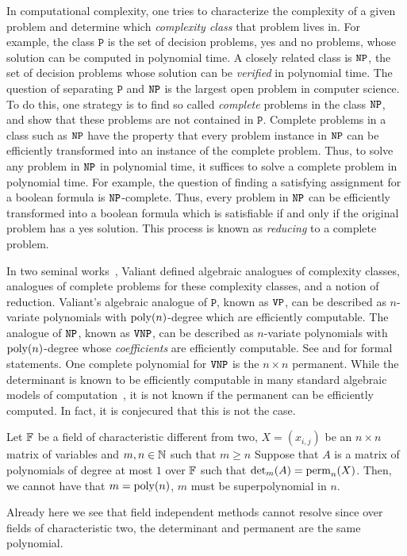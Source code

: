 \documentclass[letterpaper, 11pt]{amsart}
\begin{document}
In computational complexity, one tries to characterize the complexity of a given problem and determine which \emph{complexity class} that problem lives in.
For example, the class $\texttt{P}$ is the set of decision problems, yes and no problems, whose solution can be computed in polynomial time.
A closely related class is $\operatorname{\texttt{NP}}$, the set of decision problems whose solution can be \emph{verified} in polynomial time.
The question of separating $\texttt{P}$ and $\operatorname{\texttt{NP}}$ is the largest open problem in computer science.
To do this, one strategy is to find so called \emph{complete} problems in the class $\operatorname{\texttt{NP}}$, and show that these problems are not contained in $\texttt{P}$.
Complete problems in a class such as $\operatorname{\texttt{NP}}$ have the property that every problem instance in $\operatorname{\texttt{NP}}$ can be efficiently transformed into an instance of the complete problem.
Thus, to solve any problem in $\operatorname{\texttt{NP}}$ in polynomial time, it suffices to solve a complete problem in polynomial time.
For example, the question of finding a satisfying assignment for a boolean formula is $\operatorname{\texttt{NP}}$-complete.
Thus, every problem in $\operatorname{\texttt{NP}}$ can be efficiently transformed into a boolean formula which is satisfiable if and only if the original problem has a yes solution.
This process is known as \emph{reducing} to a complete problem.

In two seminal works~\cite{Val79, Val81}, Valiant defined algebraic analogues of complexity classes, analogues of complete problems for these complexity classes, and a notion of reduction.
Valiant's algebraic analogue of $\texttt{P}$, known as $\operatorname{\texttt{VP}}$, can be described as $n$-variate polynomials with $\operatorname{poly}(n)$-degree which are efficiently computable.
The analogue of $\operatorname{\texttt{NP}}$, known as $\operatorname{\texttt{VNP}}$, can be described as $n$-variate polynomials with $\operatorname{poly}(n)$-degree whose \emph{coefficients} are efficiently computable.
See  and  for formal statements.
One complete polynomial for $\operatorname{\texttt{VNP}}$ is the $n \times n$ permanent.
While the determinant is known to be efficiently computable in many standard algebraic models of computation~\cite{Csa76}, it is not known if the permanent can be efficiently computed.
In fact, it is conjecured that this is not the case.
\begin{conj}\label{conj:det_vs_perm}
  Let $\mathbb{F}$ be a field of characteristic different from two, $X = (x_{i, j})$ be an $n \times n$ matrix of variables and $m, n \in \mathbb{N}$ such that $m \geq n$
  Suppose that $A$ is a matrix of polynomials of degree at most $1$ over $\mathbb{F}$ such that $\det_m(A) = \operatorname{perm}_n(X)$.
  Then, we cannot have that $m = \operatorname{poly}(n)$, $m$ must be superpolynomial in $n$.
\end{conj}
Already here we see that field independent methods cannot resolve  since over fields of characteristic two, the determinant and permanent are the same polynomial.
\end{document}
